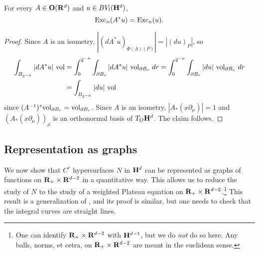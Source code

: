 \begin{lemma}\label{excess rotation invariant}
For every $A \in \mathbf{O}(\mathbf{R}^d)$ and $u \in BV_l(\mathbf H^d)$,
$$\operatorname{Exc}_n(A^* u) = \operatorname{Exc}_n(u).$$
\end{lemma}
\begin{proof}
Since $A$ is an isometry, $|(d A^* u)_{\Phi(A)(P)}| = |(du)_P|$, so
\begin{align*}
\int_{B_{2^{-n}}} |dA^*u| ~\mathrm{vol} &= \int_0^{2^{-n}} \int_{\partial B_r} |dA^* u| ~\mathrm{vol}_{\partial B_r} ~dr = \int_0^{2^{-n}} \int_{\partial B_r} |du| ~\mathrm{vol}_{\partial B_r} ~dr\\
&= \int_{B_{2^{-n}}} |du| ~\mathrm{vol}
\end{align*}
since $(A^{-1})^* \mathrm{vol}_{\partial B_r} = \mathrm{vol}_{\partial B_r}$.
Since $A$ is an isometry, $|A_* (x \partial_\mu)| = 1$ and $(A_*(x \partial_\mu))_\mu$ is an orthonormal basis of $T_O \mathbf H^d$.
The claim follows.
\end{proof}

\subsection{Representation as graphs}

We now show that $C^r$ hypersurfaces $N$ in $\mathbf H^d$ can be represented as graphs of functions on $\mathbf{R}_+ \times \mathbf{R}^{d - 2}$ in a quantitative way.
This allows us to reduce the study of $N$ to the study of a weighted Plateau equation on $\mathbf{R}_+ \times \mathbf{R}^{d - 2}$.\footnote{One can identify $\mathbf{R}_+ \times \mathbf{R}^{d - 2}$ with $\mathbf H^{d - 1}$, but we do \emph{not} do so here. Any balls, norms, et cetra, on $\mathbf{R}_+ \times \mathbf{R}^{d - 2}$ are meant in the euclidean sense.}
This result is a generalization of \cite[Theorem 4.8]{Giusti77}, and its proof is similar, but one needs to check that the integral curves are straight lines.


